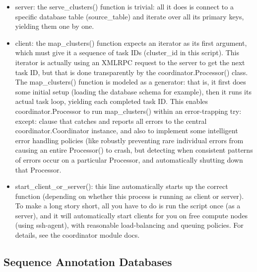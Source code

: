 \documentclass{howto}
\begin{document}
\begin{itemize}

\item
server: the serve_clusters() function is trivial: all it does is connect to a specific database table (source_table) and iterate over all its primary keys, yielding them one by one.

\item    
client: the map_clusters() function expects an iterator as its first argument, which must give it a sequence of task IDs (cluster_id in this script).  This iterator is actually using an XMLRPC request to the server to get the next task ID, but that is done transparently by the coordinator.Processor() class.  The map_clusters() function is modeled as a generator: that is, it first does some initial setup (loading the database schema for example), then it runs its actual task loop, yielding each completed task ID. This enables coordinator.Processor to run map_clusters() within an error-trapping try: except: clause that catches and reports all errors to the central coordinator.Coordinator instance, and also to implement some intelligent error handling policies (like robustly preventing rare individual errors from causing an entire Processor() to crash, but detecting when consistent patterns of errors occur on a particular Processor, and automatically shutting down that Processor.

\item 
start_client_or_server(): this line automatically starts up the correct function (depending on whether this process is running as client or server).  To make a long story short, all you have to do is run the script once (as a server), and it will automatically start clients for you on free compute nodes (using ssh-agent), with reasonable load-balancing and queuing policies.  For details, see the coordinator module docs.
\end{itemize}


\subsection{Sequence Annotation Databases}
\end{document}
